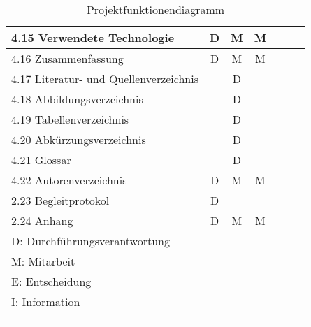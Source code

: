 \begin{longtable}{|l|c|c|c|c|c|c|}
    4.15 Verwendete Technologie            & D              & M           & M          &          &               &               \\ \hline
    4.16 Zusammenfassung                   & D              & M           & M          &          &               &               \\ \hline
    4.17 Literatur- und Quellenverzeichnis &                & D           &            &          &               &               \\ \hline
    4.18 Abbildungsverzeichnis             &                & D           &            &          &               &               \\ \hline
    4.19 Tabellenverzeichnis               &                & D           &            &          &               &               \\ \hline
    4.20 Abkürzungsverzeichnis             &                & D           &            &          &               &               \\ \hline
    4.21 Glossar                           &                & D           &            &          &               &               \\ \hline
    4.22 Autorenverzeichnis                & D              & M           & M          &          &               &               \\ \hline
    2.23 Begleitprotokol                   & D              &             &            &          &               &               \\ \hline
    2.24 Anhang                            & D              & M           & M          &          &               &               \\ \hline

    \multicolumn{7}{|l|}{D: Durchführungsverantwortung}                                                                           \\
    \multicolumn{7}{|l|}{M: Mitarbeit}                                                                                            \\
    \multicolumn{7}{|l|}{E: Entscheidung}                                                                                         \\
    \multicolumn{7}{|l|}{I: Information}                                                                                          \\ \hline

    \multicolumn{7}{c}{}                                                                                                          \\

    \caption{Projektfunktionendiagramm}
    \label{tab:projektfunktionendiagramm}
\end{longtable}